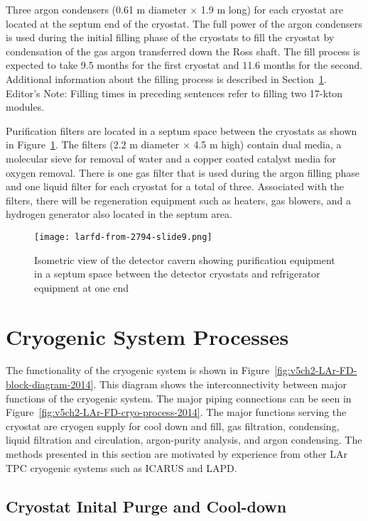Three argon condensers (0.61 m diameter $\times$ 1.9 m long) for each cryostat are located at the
septum end of the cryostat. The full power of the argon condensers is used during the initial
filling phase of the cryostats to fill the cryostat by condensation of the gas argon transferred
down the Ross shaft. The fill process is expected to take 9.5 months for the first cryostat and
11.6 months for the second. Additional information about the filling process is described in
Section~\ref{sec:cryo-sys-proc}.  
\notestart
Editor's Note:  Filling times in preceding sentences refer to filling two 17-kton modules.
\notestop

Purification filters are located in a septum space between the cryostats as shown in Figure~\ref{fig:det-cavern-purif}. The filters (2.2 m
diameter $\times$ 4.5 m high) contain dual media, a molecular sieve for removal of water and a copper
coated catalyst media for oxygen removal. There is one gas filter that is used during the argon
filling phase and one liquid filter for each cryostat for a total of three. Associated with the
filters, there will be regeneration equipment such as heaters, gas blowers, and a hydrogen
generator also located in the septum area. 

\begin{figure}[htbp]
\centering
\texttt{[image: larfd-from-2794-slide9.png]} 
\caption{Isometric view of the detector cavern showing purification equipment in a septum
space between the detector cryostats and refrigerator equipment at one end}
\label{fig:det-cavern-purif}
\end{figure}


\section{Cryogenic System Processes}
\label{sec:cryo-sys-proc}
The functionality of the cryogenic system is
shown in Figure~\ref{fig:v5ch2-LAr-FD-block-diagram-2014}. This diagram shows
the interconnectivity between major functions of the cryogenic system. The major piping
connections can be seen in Figure~\ref{fig:v5ch2-LAr-FD-cryo-process-2014}. The major functions serving the
cryostat are cryogen supply for cool down and fill, gas
filtration, condensing, liquid filtration and circulation, argon-purity analysis, and argon condensing. The methods presented in this section are motivated by
experience from other LAr TPC cryogenic systems such as ICARUS and LAPD.

\subsection{Cryostat Inital Purge and Cool-down}

